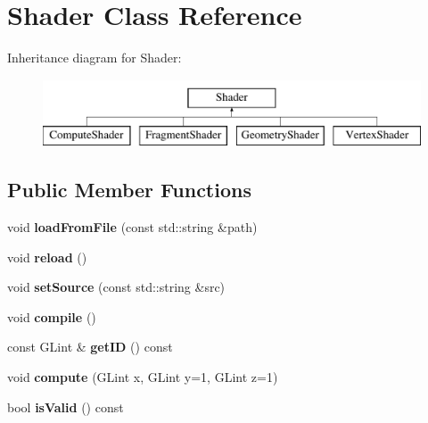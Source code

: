 \hypertarget{class_shader}{\section{Shader Class Reference}
\label{class_shader}
}
Inheritance diagram for Shader\+:\begin{figure}[H]
\begin{center}
\leavevmode
\includegraphics[height=2.000000cm]{class_shader}
\end{center}
\end{figure}
\subsection*{Public Member Functions}
\begin{DoxyCompactItemize}
\item 
\hypertarget{class_shader_a4921f5190ea9a2462b36a14d75b442b3}{void {\bfseries load\+From\+File} (const std\+::string \&path)}\label{class_shader_a4921f5190ea9a2462b36a14d75b442b3}

\item 
\hypertarget{class_shader_a7d3a2d0c4d1dc1c61338459e9ae09d8c}{void {\bfseries reload} ()}\label{class_shader_a7d3a2d0c4d1dc1c61338459e9ae09d8c}

\item 
\hypertarget{class_shader_a2bc90a28b475059544eaaf3054c9bf48}{void {\bfseries set\+Source} (const std\+::string \&src)}\label{class_shader_a2bc90a28b475059544eaaf3054c9bf48}

\item 
\hypertarget{class_shader_a5be69e48ac2436651ead777bf5fb5c9f}{void {\bfseries compile} ()}\label{class_shader_a5be69e48ac2436651ead777bf5fb5c9f}

\item 
\hypertarget{class_shader_a12f70d569014888000fe3da14f0767ac}{const G\+Lint \& {\bfseries get\+I\+D} () const }\label{class_shader_a12f70d569014888000fe3da14f0767ac}

\item 
\hypertarget{class_shader_acd99c9c86c328bfd886541ad508ee21f}{void {\bfseries compute} (G\+Lint x, G\+Lint y=1, G\+Lint z=1)}\label{class_shader_acd99c9c86c328bfd886541ad508ee21f}

\item 
\hypertarget{class_shader_a630c9333e201e7a51a92778c54432022}{bool {\bfseries is\+Valid} () const }\label{class_shader_a630c9333e201e7a51a92778c54432022}

\end{DoxyCompactItemize}
